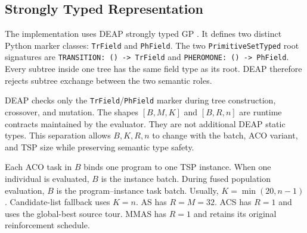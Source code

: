 \documentclass[letterpaper,journal]{IEEEtran}
\begin{document}
\subsection{Strongly Typed Representation}

The implementation uses DEAP strongly typed GP
\cite{montana1995stgp,fortin2012deap}.
It defines two distinct Python marker classes:
\texttt{TrField} and \texttt{PhField}.
The two \texttt{PrimitiveSetTyped} root signatures are
\texttt{TRANSITION: () -> TrField} and
\texttt{PHEROMONE: () -> PhField}.
Every subtree inside one tree has the same field type as its root.
DEAP therefore rejects subtree exchange between the two semantic roles.

\begin{table}[t]
\caption{Input, output, and execution location of the two typed GP trees}
\label{tab:strong-type}
\centering
\footnotesize
\renewcommand{\arraystretch}{1.15}
\end{table}

DEAP checks only the \texttt{TrField}/\texttt{PhField} marker during tree
construction, crossover, and mutation.
The shapes \([B,M,K]\) and \([B,R,n]\) are runtime contracts maintained by
the evaluator.
They are not additional DEAP static types.
This separation allows \(B,K,R,n\) to change with the batch, ACO variant,
and TSP size while preserving semantic type safety.

Each ACO task in \(B\) binds one program to one TSP instance.
When one individual is evaluated, \(B\) is the instance batch.
During fused population evaluation, \(B\) is the program--instance task batch.
Usually, \(K=\min(20,n-1)\).
Candidate-list fallback uses \(K=n\).
AS has \(R=M=32\).
ACS has \(R=1\) and uses the global-best source tour.
MMAS has \(R=1\) and retains its original reinforcement schedule.
\end{document}
